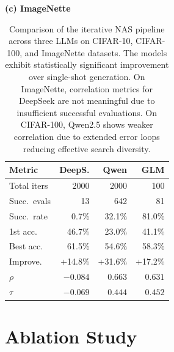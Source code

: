 \documentclass[10pt,twocolumn,letterpaper]{article}
\begin{document}
\begin{table}[t]
		\hfill
		\begin{minipage}[t]{0.32\textwidth}
			\centering
			\centerline{\textbf{(c) ImageNette}}
			\vspace{0.1cm}
			\begin{tabular}{lrrr}
				\toprule
				\textbf{Metric} & \textbf{DeepS.} & \textbf{Qwen} & \textbf{GLM} \\
				\midrule
				Total iters & 2000 & 2000 & 100 \\
				Succ.\ evals & 13 & 642 & 81 \\
				Succ.\ rate & 0.7\% & 32.1\% & 81.0\% \\
				\midrule
				1st acc. & 46.7\% & 23.0\% & 41.1\% \\
				Best acc. & 61.5\% & 54.6\% & 58.3\% \\
				Improve. & +14.8\% & +31.6\% & +17.2\% \\
				\midrule
				$\rho$ & $-0.084$ & $0.663$ & $0.631$ \\
				$\tau$ & $-0.069$ & $0.444$ & $0.452$ \\
				\bottomrule
			\end{tabular}
		\end{minipage}
		\caption{Comparison of the iterative NAS pipeline across three LLMs on CIFAR-10, CIFAR-100, and ImageNette datasets. The models exhibit statistically significant improvement over single-shot generation. On ImageNette, correlation metrics for DeepSeek are not meaningful due to insufficient successful evaluations. On CIFAR-100, Qwen2.5 shows weaker correlation due to extended error loops reducing effective search diversity.}
		\label{table:summary_combined}
	\end{table}
	


	\section{Ablation Study}
	\label{sec:ablation}
    
\end{document}
